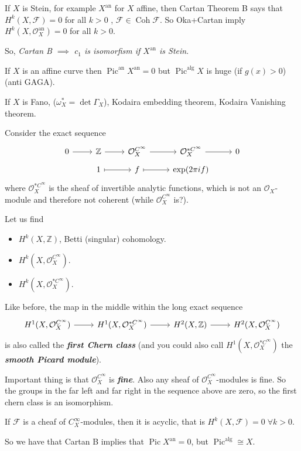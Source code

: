 \documentclass{article}
\newcommand{\Z}{\mathbb{Z}}
\newcommand{\Fc}{\mathcal{F}}
\newcommand{\Oc}{\mathcal{O}}
\newcommand{\Cinf}{C^\infty}
\DeclareMathOperator{\Coh}{Coh}
\DeclareMathOperator{\an}{an}
\DeclareMathOperator{\alg}{alg}
\DeclareMathOperator{\Pic}{Pic}
\begin{document}
\begin{example}
	If $X$ is Stein, for example $X^{\an}$ for $X$ affine, then Cartan Theorem B says that $H^k(X,\Fc)=0$ for all $k>0$ , $\Fc\in\Coh\Fc$. So Oka+Cartan imply $H^k(X,\Oc_X^{\an})=0$ for all $k>0$.
	
	So, \textit{Cartan B $\implies$ $c_1$ is isomorfism if $X^{\an}$ is Stein}.
\end{example}
\begin{example}[subexample]
	If $X$ is an affine curve then $\Pic^{\an}X^{\an}=0$ but $\Pic^{\alg}X$ is huge (if $g(x)>0$) (anti GAGA).
\end{example}
\begin{example}
	If $X$ is Fano, ($\omega^*_X=\det\Gamma_X$), Kodaira embedding theorem, Kodaira Vanishing theorem.
\end{example}

\begin{example}
	Consider the exact sequence
	\[\begin{tikzcd}[row sep=tiny]
		0\arrow[r]&\Z\arrow[r]&\Oc_X^{\Cinf}\arrow[r]&\Oc_X^{*\Cinf}\arrow[r]&0\\
		&1\arrow[r,maps to]&f\arrow[r,maps to]&\exp(2\pi if)
	\end{tikzcd}\]
	where $\Oc_X^{*\Cinf}$ is the sheaf of invertible analytic functions, which is not an $\Oc_X$-module and therefore not coherent ({\color{magenta}while $\Oc_X^{\Cinf}$ is?}).
	
	Let us find
	\begin{itemize}
		\item $H^k(X,\Z)$, Betti (singular) cohomology.
		\item $H^k(X,\Oc_X^{\Cinf})$.
		\item $H^k(X,\Oc^{*\Cinf}_X)$.
	\end{itemize}
	Like before, the map in the middle within the long exact sequence
	\[\begin{tikzcd}[row sep=tiny]
		H^1(X,\Oc^{\Cinf}_X)\arrow[r]&H^1(X,\Oc^{*\Cinf}_X)\arrow[r]&H^2(X,\Z)\arrow[r]&H^2(X,\Oc^{\Cinf}_X)
	\end{tikzcd}\]
	is also called the \textbf{\textit{first Chern class}} (and you could also call $H^1(X,\Oc^{*\Cinf}_X)$ the \textbf{\textit{smooth Picard module}}).
	
	Important thing is that $\Oc_X^{\Cinf}$ is \textbf{\textit{fine}}. Also any sheaf of $\Oc_X^{\Cinf}$-modules is fine. So the groups in the far left and far right in the sequence above are zero, so the first chern class is an isomorphism.
	
	\begin{coro}
		If $\Fc$ is a cheaf of $\Cinf_X$-modules, then it is acyclic, that is $H^k(X,\Fc)=0\;\forall k>0$.
	\end{coro}
\end{example}
\begin{remark}
	So we have that Cartan B implies that $\Pic X^{\an}=0$, but $\Pic^{\alg}\cong X$.
\end{remark}
\end{document}
